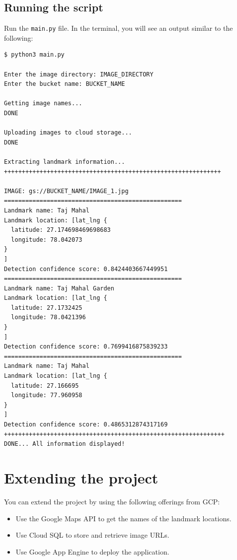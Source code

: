\documentclass{article}
\begin{document}
\subsection*{Running the script}

Run the \texttt{main.py} file. In the terminal, you will see an output similar to the following:

\begin{lstlisting}[style=bash]
$ python3 main.py 

Enter the image directory: IMAGE_DIRECTORY
Enter the bucket name: BUCKET_NAME

Getting image names...
DONE 

Uploading images to cloud storage...
DONE 

Extracting landmark information...
+++++++++++++++++++++++++++++++++++++++++++++++++++++++++++++

IMAGE: gs://BUCKET_NAME/IMAGE_1.jpg 
==================================================
Landmark name: Taj Mahal
Landmark location: [lat_lng {
  latitude: 27.174698469698683
  longitude: 78.042073
}
]
Detection confidence score: 0.8424403667449951
==================================================
Landmark name: Taj Mahal Garden
Landmark location: [lat_lng {
  latitude: 27.1732425
  longitude: 78.0421396
}
]
Detection confidence score: 0.7699416875839233
==================================================
Landmark name: Taj Mahal
Landmark location: [lat_lng {
  latitude: 27.166695
  longitude: 77.960958
}
]
Detection confidence score: 0.4865312874317169
++++++++++++++++++++++++++++++++++++++++++++++++++++++++++++++
DONE... All information displayed!
\end{lstlisting}

\section*{Extending the project}

You can extend the project by using the following offerings from GCP:

\begin{itemize}
    \item Use the Google Maps API to get the names of the landmark locations.
    
    \item Use Cloud SQL to store and retrieve image URLs.
    
    \item Use Google App Engine to deploy the application.
\end{itemize}
\end{document}
